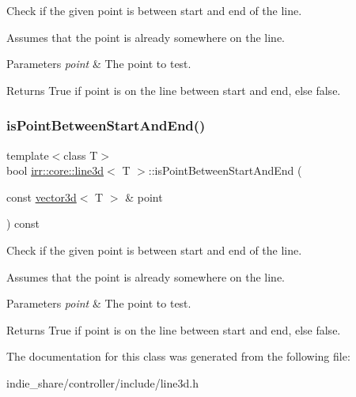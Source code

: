Check if the given point is between start and end of the line. 

Assumes that the point is already somewhere on the line. 
\begin{DoxyParams}{Parameters}
{\em point} & The point to test. \\
\hline
\end{DoxyParams}
\begin{DoxyReturn}{Returns}
True if point is on the line between start and end, else false. 
\end{DoxyReturn}
\mbox{\label{classirr_1_1core_1_1line3d_abe1e874f2058e965bc52802c41672fbc}} 
\subsubsection{\texorpdfstring{is\+Point\+Between\+Start\+And\+End()}{isPointBetweenStartAndEnd()}\hspace{0.1cm}{\footnotesize\ttfamily [2/2]}}
{\footnotesize\ttfamily template$<$class T$>$ \\
bool \hyperlink{classirr_1_1core_1_1line3d}{irr\+::core\+::line3d}$<$ T $>$\+::is\+Point\+Between\+Start\+And\+End (\begin{DoxyParamCaption}\item[{const \hyperlink{classirr_1_1core_1_1vector3d}{vector3d}$<$ T $>$ \&}]{point }\end{DoxyParamCaption}) const\hspace{0.3cm}{\ttfamily [inline]}}



Check if the given point is between start and end of the line. 

Assumes that the point is already somewhere on the line. 
\begin{DoxyParams}{Parameters}
{\em point} & The point to test. \\
\hline
\end{DoxyParams}
\begin{DoxyReturn}{Returns}
True if point is on the line between start and end, else false. 
\end{DoxyReturn}


The documentation for this class was generated from the following file\+:\begin{DoxyCompactItemize}
\item 
indie\+\_\+share/controller/include/line3d.\+h\end{DoxyCompactItemize}
